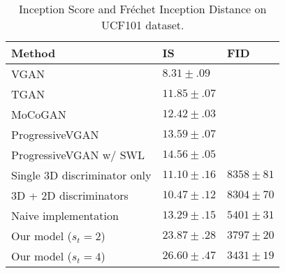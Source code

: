 \documentclass[twocolumn]{svjour3}
\begin{document}
\begin{table}[t]
\centering
{\renewcommand{\arraystretch}{1.2}
\begin{tabular}{lll}
Method & IS & FID \\ \hline \hline
VGAN \cite{Vondrick2016} & $8.31 \pm .09$ \\
TGAN \cite{Saito2017} & $11.85 \pm .07$ \\
MoCoGAN \cite{Tulyakov2018} & $12.42 \pm .03$ \\
ProgressiveVGAN \cite{Acharya2018} & $13.59 \pm .07$ \\
ProgressiveVGAN w/ SWL \cite{Acharya2018} & $14.56 \pm .05$ \\ \hline
Single 3D discriminator only & $11.10 \pm .16$ & $8358 \pm 81$ \\
3D + 2D discriminators & $10.47 \pm .12$ & $8304 \pm 70$ \\
Naive implementation & $13.29 \pm .15$ & $5401 \pm 31$ \\ \hline






Our model ($s_t = 2$) & $23.87 \pm .28$ & $3797 \pm 20$ \\
Our model ($s_t = 4$) & $26.60 \pm .47$ & $3431 \pm 19$ \\ \hline
\end{tabular}
}
\caption{Inception Score and Fr\'echet Inception Distance on UCF101 dataset.}
\label{table:inception_score}
\vspace{-10pt}
\end{table}
\end{document}
